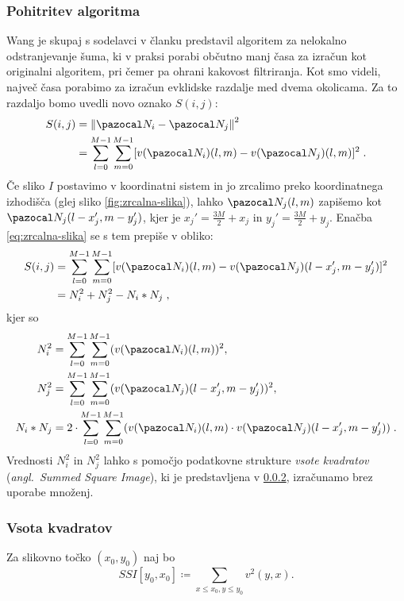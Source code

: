\subsubsection{Pohitritev algoritma}
Wang je skupaj s sodelavci v članku \cite{Wang:fastNMD} predstavil algoritem za nelokalno odstranjevanje šuma, ki v praksi porabi občutno manj časa za izračun kot originalni algoritem, pri čemer pa ohrani kakovost filtriranja. Kot smo videli, največ časa porabimo za izračun evklidske razdalje med dvema okolicama. Za to razdaljo bomo uvedli novo oznako $S(i, j)$:
%
\begin{align} \label{eq:zrcalna-slika}
  S(i, j) & = \norm{\NN_i - \NN_j}^2 \\
          & = \sum_{l=0}^{M-1} \sum_{m=0}^{M-1} [v(\NN_i)(l, m) - v(\NN_j)(l, m)]^2 \;.
\end{align}
%
Če sliko $I$ postavimo v koordinatni sistem in jo zrcalimo preko koordinatnega izhodišča (glej sliko \ref{fig:zrcalna-slika}), lahko $\NN_j(l, m)$ zapišemo kot $\NN_j(l - x_j', m - y_j')$, kjer je $x_j' = \frac{3M}{2} + x_j$ in $y_j' = \frac{3M}{2} + y_j$. Enačba \eqref{eq:zrcalna-slika} se s tem prepiše v obliko:
%
\begin{align*}
S(i, j) & = \sum_{l=0}^{M-1} \sum_{m=0}^{M-1} [v(\NN_i)(l, m) - v(\NN_j)(l - x_j', m - y_j')]^2 \\
         & = N_i^2 + N_j^2 - N_i \ast N_j \;,
\end{align*}
%
kjer so
%
\begin{align*}
N_i^2 & = \sum_{l=0}^{M-1} \sum_{m=0}^{M-1} (v(\NN_i)(l, m))^2, \\
N_j^2 & = \sum_{l=0}^{M-1} \sum_{m=0}^{M-1} (v(\NN_j)(l - x_j', m - y_j'))^2, \\
N_i \ast N_j & = 2 \cdot \sum_{l=0}^{M-1} \sum_{m=0}^{M-1} (v(\NN_i)(l, m) \cdot v(\NN_j)(l - x_j', m - y_j'))\;.
\end{align*}
%
Vrednosti $N_i^2$ in $N_j^2$ lahko s pomočjo podatkovne strukture \emph{vsote kvadratov} (\emph{angl.\ Summed Square Image}), ki je predstavljena v \ref{sec:vsota-kvadratov},  izračunamo brez uporabe množenj. 
%
\subsubsection{Vsota kvadratov}\label{sec:vsota-kvadratov}
Za slikovno točko $(x_0, y_0)$ naj bo
%
$$SSI[y_0, x_0] \coloneqq \sum_{x \leq x_0, y \leq y_0} v^2(y, x).$$

